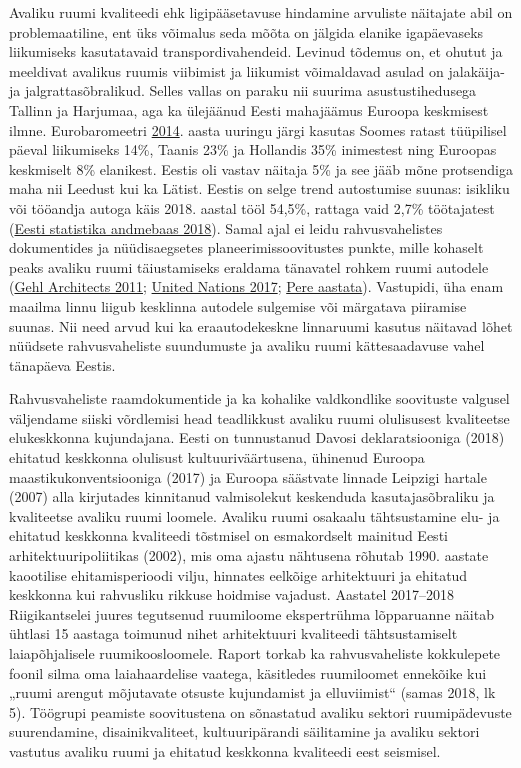 \documentclass[estonian,]{article}
\begin{document}
Avaliku ruumi kvaliteedi ehk ligipääsetavuse hindamine arvuliste näitajate abil on problemaatiline, ent üks võimalus seda mõõta on jälgida elanike igapäevaseks liikumiseks kasutatavaid transpordivahendeid. Levinud tõdemus on, et ohutut ja meeldivat avalikus ruumis viibimist ja liikumist võimaldavad asulad on jalakäija- ja jalgrattasõbralikud. Selles vallas on paraku nii suurima asustustihedusega Tallinn ja Harjumaa, aga ka ülejäänud Eesti mahajäämus Euroopa keskmisest ilmne. Eurobaromeetri \protect\hyperlink{Eurobarometer2014}{2014}. aasta uuringu järgi kasutas Soomes ratast tüüpilisel päeval liikumiseks 14\%, Taanis 23\% ja Hollandis 35\% inimestest ning Euroopas keskmiselt 8\% elanikest. Eestis oli vastav näitaja 5\% ja see jääb mõne protsendiga maha nii Leedust kui ka Lätist. Eestis on selge trend autostumise suunas: isikliku või tööandja autoga käis 2018. aastal tööl 54,5\%, rattaga vaid 2,7\% töötajatest (\protect\hyperlink{Eesti2018}{Eesti statistika andmebaas 2018}). Samal ajal ei leidu rahvusvahelistes dokumentides ja nüüdisaegsetes planeerimissoovitustes punkte, mille kohaselt peaks avaliku ruumi täiustamiseks eraldama tänavatel rohkem ruumi autodele (\protect\hyperlink{Gehl2011}{Gehl Architects 2011}; \protect\hyperlink{United2017}{United Nations 2017}; \protect\hyperlink{Pere}{Pere aastata}). Vastupidi, üha enam maailma linnu liigub kesklinna autodele sulgemise või märgatava piiramise suunas. Nii need arvud kui ka eraautodekeskne linnaruumi kasutus näitavad lõhet nüüdsete rahvusvaheliste suundumuste ja avaliku ruumi kättesaadavuse vahel tänapäeva Eestis.

Rahvusvaheliste raamdokumentide ja ka kohalike valdkondlike soovituste valgusel väljendame siiski võrdlemisi head teadlikkust avaliku ruumi olulisusest kvaliteetse elukeskkonna kujundajana. Eesti on tunnustanud Davosi deklaratsiooniga (2018) ehitatud keskkonna olulisust kultuuriväärtusena, ühinenud Euroopa maastikukonventsiooniga (2017) ja Euroopa säästvate linnade Leipzigi hartale (2007) alla kirjutades kinnitanud valmisolekut keskenduda kasutajasõbraliku ja kvaliteetse avaliku ruumi loomele. Avaliku ruumi osakaalu tähtsustamine elu- ja ehitatud keskkonna kvaliteedi tõstmisel on esmakordselt mainitud Eesti arhitektuuripoliitikas (2002), mis oma ajastu nähtusena rõhutab 1990. aastate kaootilise ehitamisperioodi vilju, hinnates eelkõige arhitektuuri ja ehitatud keskkonna kui rahvusliku rikkuse hoidmise vajadust. Aastatel 2017--2018 Riigikantselei juures tegutsenud ruumiloome ekspertrühma lõpparuanne näitab ühtlasi 15 aastaga toimunud nihet arhitektuuri kvaliteedi tähtsustamiselt laiapõhjalisele ruumikoosloomele. Raport torkab ka rahvusvaheliste kokkulepete foonil silma oma laiahaardelise vaatega, käsitledes ruumiloomet ennekõike kui „ruumi arengut mõjutavate otsuste kujundamist ja elluviimist`` (samas 2018, lk 5). Töögrupi peamiste soovitustena on sõnastatud avaliku sektori ruumipädevuste suurendamine, disainikvaliteet, kultuuripärandi säilitamine ja avaliku sektori vastutus avaliku ruumi ja ehitatud keskkonna kvaliteedi eest seismisel.
\end{document}
